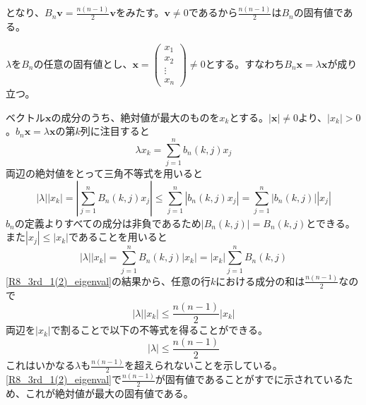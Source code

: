 \documentclass[dvipdfmx]{jsreport}
\begin{document}
\begin{souanswer}
\begin{enumerate}
\begin{enumerate_alpha}
\begin{equation*}
\end{equation*}
	となり、$B_n\bm{v}= \frac{n(n- 1)}{2}\bm{v}$をみたす。$\bm{v}\ne 0$であるから$\frac{n(n- 1)}{2}$は$B_n$の固有値である。
	\item $\lambda$を$B_n$の任意の固有値とし、$\bm{x}= \begin{pmatrix}x_1\\ x_2\\ \vdots\\ x_n\end{pmatrix}\ne 0$とする。すなわち$B_n\bm{x}= \lambda\bm{x}$が成り立つ。
\end{enumerate_alpha}
	ベクトル$\bm{x}$の成分のうち、絶対値が最大のものを$x_k$とする。$|\bm{x}|\ne 0$より、$|x_k|> 0$。$b_n\bm{x}= \lambda\bm{x}$の第$k$列に注目すると
\begin{equation*}
	\lambda x_k= \sum_{j= 1}^n b_n(k, j)x_j
\end{equation*}
	両辺の絶対値をとって三角不等式を用いると
\begin{equation*}
	|\lambda||x_k|= \left|\sum_{j= 1}^n B_n(k, j)x_j\right|\le \sum_{j= 1}^n |b_n(k, j)x_j|= \sum_{j= 1}^n |b_n(k, j)||x_j|
\end{equation*}
	$b_n$の定義よりすべての成分は非負であるため$|B_n(k, j)|= B_n(k, j)$とできる。また$|x_j|\le |x_k|$であることを用いると
\begin{equation*}
	|\lambda||x_k|= \sum_{j= 1}^n B_n(k, j)|x_k|= |x_k|\sum_{j= 1}^n B_n(k, j)
\end{equation*}
	\ref{R8_3rd_1(2)_eigenval}の結果から、任意の行$k$における成分の和は$\frac{n(n- 1)}{2}$なので
\begin{equation*}
	|\lambda||x_k|\le \frac{n(n- 1)}{2}|x_k|
\end{equation*}
	両辺を$|x_k|$で割ることで以下の不等式を得ることができる。
\begin{equation*}
	|\lambda|\le \frac{n(n- 1)}{2}
\end{equation*}
	これはいかなる$\lambda$も$\frac{n(n- 1)}{2}$を超えられないことを示している。\ref{R8_3rd_1(2)_eigenval}で$\frac{n(n- 1)}{2}$が固有値であることがすでに示されているため、これが絶対値が最大の固有値である。
\end{enumerate}
\end{souanswer}
\end{document}
